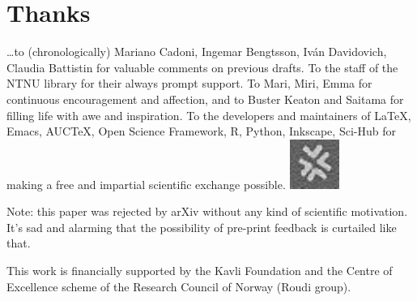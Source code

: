 \documentclass[\ifafour a4paper,12pt,\else a5paper,10pt,\fi%
onecolumn,oneside,article,%
british%
]{memoir}
\theoremstyle{remark}
\theoremstyle{innote}
\renewcommand*{\finalnamedelim}{\addspace\amp\space}
\newcommand*{\amp}{\&}
\newenvironment{acknowledgements}{\section*{Thanks}\addcontentsline{toc}{section}{Thanks}}{\par}
\newcommand*\autanet{\includegraphics[height=\heightof{M}]{autanet.pdf}}
\renewcommand*{\|}[1][]{\nonscript\,#1\vert\nonscript\;\mathopen{}}
\begin{document}


\begin{acknowledgements}
  \ldots to (chronologically) Mariano Cadoni, Ingemar Bengtsson, Iv\'an
  Davidovich, Claudia Battistin for valuable comments on previous drafts.
  To the staff of the NTNU library for their always prompt support. To
  Mari, Miri, Emma for continuous encouragement and affection, and to
  Buster Keaton and Saitama for filling life with awe and inspiration. To
  the developers and maintainers of \LaTeX, Emacs, AUC\TeX, Open Science
  Framework, R, Python, Inkscape, Sci-Hub for making a free and impartial
  scientific exchange possible. \mbox{}\hfill\autanet

  Note: this paper was rejected by arXiv without any kind of scientific
  motivation. It's sad and alarming that the possibility of pre-print
  feedback is curtailed like that.
  
  This work is financially supported by the Kavli Foundation and the Centre
  of Excellence scheme of the Research Council of Norway (Roudi
  group).
\end{acknowledgements}


\renewcommand*{\finalnamedelim}{\addcomma\space}

\printbibliography[prenote=prenote%
]
\end{document}
